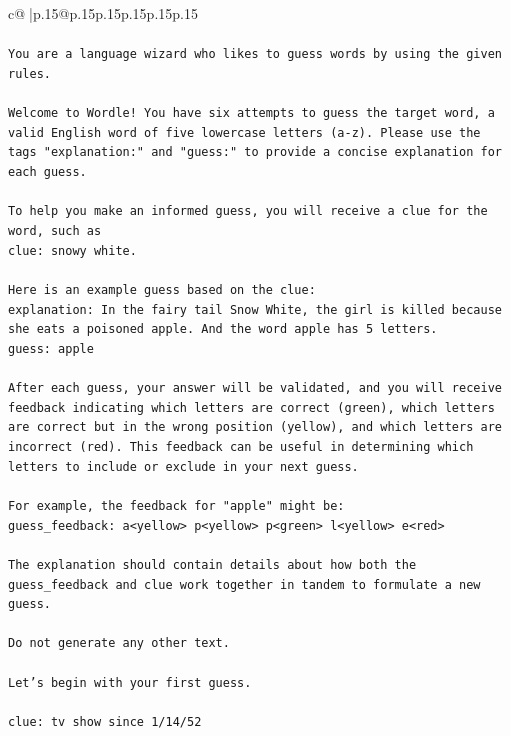 \documentclass{article}
\begin{document}
{\begin{supertabular}{c@{$\;$}|p{.15\linewidth}@{}p{.15\linewidth}p{.15\linewidth}p{.15\linewidth}p{.15\linewidth}p{.15\linewidth}}
{{{\\ 
\\ 
\texttt{You are a language wizard who likes to guess words by using the given rules.} \\
\\ 
\texttt{Welcome to Wordle! You have six attempts to guess the target word, a valid English word of five lowercase letters (a{-}z). Please use the tags "explanation:" and "guess:" to provide a concise explanation for each guess.} \\
\\ 
\texttt{To help you make an informed guess, you will receive a clue for the word, such as} \\
\texttt{clue: snowy white.} \\
\\ 
\texttt{Here is an example guess based on the clue:} \\
\texttt{explanation: In the fairy tail Snow White, the girl is killed because she eats a poisoned apple. And the word apple has 5 letters.} \\
\texttt{guess: apple} \\
\\ 
\texttt{After each guess, your answer will be validated, and you will receive feedback indicating which letters are correct (green), which letters are correct but in the wrong position (yellow), and which letters are incorrect (red). This feedback can be useful in determining which letters to include or exclude in your next guess.} \\
\\ 
\texttt{For example, the feedback for "apple" might be:} \\
\texttt{guess\_feedback: a<yellow> p<yellow> p<green> l<yellow> e<red>} \\
\\ 
\texttt{The explanation should contain details about how both the guess\_feedback and clue work together in tandem to formulate a new guess.} \\
\\ 
\texttt{Do not generate any other text.} \\
\\ 
\texttt{Let's begin with your first guess.} \\
\\ 
\texttt{clue: tv show since 1/14/52} \\
            }
        }
    }
     \\ \\


\end{supertabular}}
\end{document}

